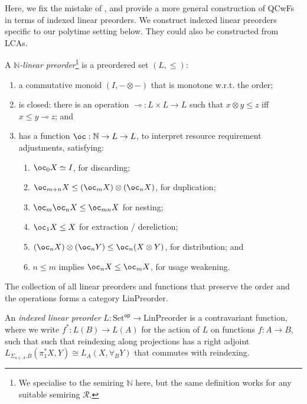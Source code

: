 \documentclass[acmsmall,screen]{acmart}
\newcommand{\Set}{\mathrm{Set}}
\newcommand{\op}{\mathsf{op}}
\newcommand{\LinPreorder}{\mathrm{LinPreorder}}
\begin{document}
Here, we fix the mistake of \citet{atkey18qtt}, and provide a more
general construction of QCwFs in terms of indexed linear preorders. We
construct indexed linear preorders specific to our polytime setting
below. They could also be constructed from LCAs.

\begin{definition}\label{def:indexed-linear-preorder}
  A \emph{$\mathbb{N}$-linear preorder}\footnote{We specialise to the semiring $\mathbb{N}$ here, but the same definition works for any suitable semiring $\mathcal{R}$.} is a preordered set
  $(L, \leq)$:
  \begin{enumerate}
  \item a commutative monoid $(I, -\otimes-)$ that is monotone
    w.r.t. the order;
  \item is closed: there is an operation
    $\multimap : L \times L \to L$ such that $x \otimes y \leq z$ iff
    $x \leq y \multimap z$; and
  \item has a function $\oc : \mathbb{N} \to L \to L$, to interpret
    resource requirement adjustments, satisfying:
    \begin{enumerate}
    \item $\oc_0 X \simeq I$, for discarding;
    \item $\oc_{m+n} X \leq (\oc_m X) \otimes (\oc_n X)$, for duplication;
    \item $\oc_m\oc_n X \leq \oc_{mn} X$ for nesting;
    \item $\oc_1 X \leq X$ for extraction / dereliction;
    \item $(\oc_n X) \otimes (\oc_n Y) \leq \oc_n(X \otimes Y)$, for distribution; and
    \item $n \leq m$ implies $\oc_n X \leq \oc_m X$, for usage weakening.
    \end{enumerate}
  \end{enumerate}
  The collection of all linear preorders and functions that preserve the
  order and the operations forms a category $\LinPreorder$.

  An \emph{indexed linear preorder} $L : \Set^\op \to \LinPreorder$ is
  a contravariant function, where we write $f^* : L(B) \to L(A)$ for
  the action of $L$ on functions $f : A \to B$, such that such that
  reindexing along projections has a right adjoint
  $L_{\Sigma_{a \in A}.B}(\pi_1^*X, Y) \cong L_{A}(X, \forall_B Y)$
  that commutes with reindexing.
\end{definition}
\end{document}
